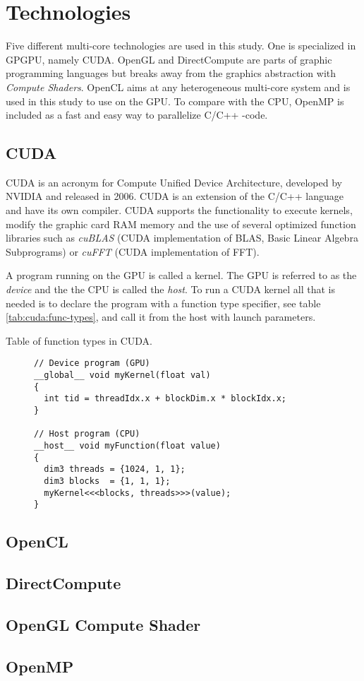 \chapter{Technologies}

Five different multi-core technologies are used in this study. One is specialized in GPGPU, namely CUDA. OpenGL and DirectCompute are parts of graphic programming languages but breaks away from the graphics abstraction with \textit{Compute Shaders}. OpenCL aims at any heterogeneous multi-core system and is used in this study to use on the GPU. To compare with the CPU, OpenMP is included as a fast and easy way to parallelize C/C++ -code.

\section{CUDA}

CUDA is an acronym for Compute Unified Device Architecture, developed by NVIDIA and released in 2006. CUDA is an extension of the C/C++ language and have its own compiler. CUDA supports the functionality to execute kernels, modify the graphic card RAM memory and the use of several optimized function libraries such as \textit{cuBLAS} (CUDA implementation of BLAS, Basic Linear Algebra Subprograms) or \textit{cuFFT} (CUDA implementation of FFT).

A program running on the GPU is called a kernel. The GPU is referred to as the \textit{device} and the the CPU is called the \textit{host}. To run a CUDA kernel all that is needed is to declare the program with a function type specifier, see table \ref{tab:cuda:func-types}, and call it from the host with launch parameters.

\begin{table}
	\centering
	
	\caption{Table of function types in CUDA.}
	\label{tab:cuda:func-types}
\end{table}

\begin{figure}
	\centering
	\lstset{language=C++}
	\begin{framed}
	\begin{lstlisting}
// Device program (GPU)
__global__ void myKernel(float val)
{
  int tid = threadIdx.x + blockDim.x * blockIdx.x;
}

// Host program (CPU)
__host__ void myFunction(float value)
{
  dim3 threads = {1024, 1, 1};
  dim3 blocks  = {1, 1, 1};
  myKernel<<<blocks, threads>>>(value);
}
	\end{lstlisting}
	\end{framed}
\end{figure}

\section{OpenCL}

\section{DirectCompute}

\section{OpenGL Compute Shader}

\section{OpenMP}